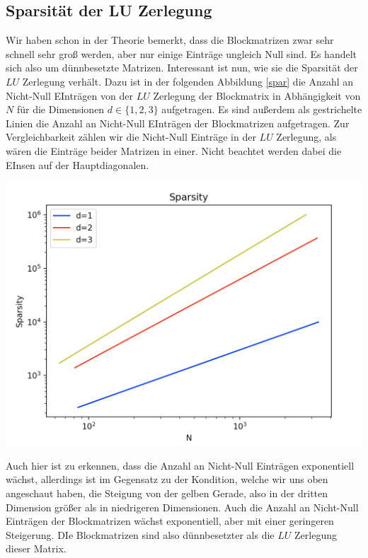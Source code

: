 \documentclass[smallheadings]{scrartcl}
\theoremstyle{definition}
\begin{document}
\subsection{Sparsität der LU Zerlegung}

Wir haben schon in der Theorie bemerkt, dass die Blockmatrizen zwar sehr schnell sehr groß werden, aber nur einige Einträge ungleich Null sind. Es handelt sich also um dünnbesetzte Matrizen. Interessant ist nun, wie sie die Sparsität der $LU$ Zerlegung verhält. Dazu ist in der folgenden Abbildung \ref{spar} die Anzahl an Nicht-Null EInträgen von der $LU$ Zerlegung der Blockmatrix in Abhängigkeit von $N$ für die Dimensionen $d\in\{1,2,3\}$ aufgetragen. Es sind außerdem als gestrichelte Linien die Anzahl an Nicht-Null EInträgen der Blockmatrizen aufgetragen. Zur Vergleichbarkeit zählen wir die Nicht-Null Einträge in der $LU$ Zerlegung, als wären die Einträge beider Matrizen in einer. Nicht beachtet werden dabei die EInsen auf der Hauptdiagonalen.

\begin{minipage}{\textwidth}
\centering

\includegraphics[scale = 0.6]{sparsity}
	\label{spar}

\end{minipage}
Auch hier ist zu erkennen, dass die Anzahl an Nicht-Null Einträgen exponentiell wächst, allerdings ist im Gegensatz zu der Kondition, welche wir uns oben angeschaut haben, die Steigung von der gelben Gerade, also in der dritten Dimension größer als in niedrigeren Dimensionen. Auch die  Anzahl an Nicht-Null Einträgen der Blockmatrizen wächst exponentiell, aber mit einer geringeren Steigerung. DIe Blockmatrizen sind also dünnbesetzter als die $LU$ Zerlegung dieser Matrix.
\end{document}
